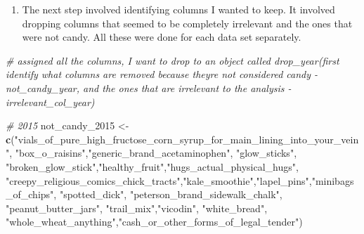 \documentclass[
]{article}
\newenvironment{Shaded}{\begin{snugshade}}{\end{snugshade}}
\newcommand{\CommentTok}[1]{\textcolor[rgb]{0.56,0.35,0.01}{\textit{#1}}}
\newcommand{\FunctionTok}[1]{\textcolor[rgb]{0.13,0.29,0.53}{\textbf{#1}}}
\newcommand{\NormalTok}[1]{#1}
\newcommand{\OtherTok}[1]{\textcolor[rgb]{0.56,0.35,0.01}{#1}}
\newcommand{\StringTok}[1]{\textcolor[rgb]{0.31,0.60,0.02}{#1}}
\providecommand{\tightlist}{%
  \setlength{\itemsep}{0pt}\setlength{\parskip}{0pt}}
\begin{document}
\begin{enumerate}
\def\labelenumi{\arabic{enumi}.}
\setcounter{enumi}{2}
\tightlist
\item
  The next step involved identifying columns I wanted to keep. It
  involved dropping columns that seemed to be completely irrelevant and
  the ones that were not candy. All these were done for each data set
  separately.
\end{enumerate}

\begin{Shaded}
\begin{Highlighting}[]
\CommentTok{\#  assigned all the columns, I want to drop to an object called \textquotesingle{}drop\_year\textquotesingle{}(first identify what columns are removed because they\textquotesingle{}re not considered candy {-} \textquotesingle{}not\_candy\_year\textquotesingle{}, and the ones that are irrelevant to the analysis {-} \textquotesingle{}irrelevant\_col\_year\textquotesingle{})}

\CommentTok{\# 2015}
\NormalTok{not\_candy\_2015 }\OtherTok{\textless{}{-}} \FunctionTok{c}\NormalTok{(}\StringTok{"vials\_of\_pure\_high\_fructose\_corn\_syrup\_for\_main\_lining\_into\_your\_vein"}\NormalTok{, }\StringTok{"box\_o\_raisins"}\NormalTok{,}\StringTok{"generic\_brand\_acetaminophen"}\NormalTok{, }\StringTok{"glow\_sticks"}\NormalTok{, }\StringTok{"broken\_glow\_stick"}\NormalTok{,}\StringTok{"healthy\_fruit"}\NormalTok{,}\StringTok{"hugs\_actual\_physical\_hugs"}\NormalTok{,  }\StringTok{"creepy\_religious\_comics\_chick\_tracts"}\NormalTok{,}\StringTok{"kale\_smoothie"}\NormalTok{,}\StringTok{"lapel\_pins"}\NormalTok{,}\StringTok{"minibags\_of\_chips"}\NormalTok{, }\StringTok{"spotted\_dick"}\NormalTok{, }\StringTok{"peterson\_brand\_sidewalk\_chalk"}\NormalTok{, }\StringTok{"peanut\_butter\_jars"}\NormalTok{, }\StringTok{"trail\_mix"}\NormalTok{,}\StringTok{"vicodin"}\NormalTok{, }\StringTok{"white\_bread"}\NormalTok{, }\StringTok{"whole\_wheat\_anything"}\NormalTok{,}\StringTok{"cash\_or\_other\_forms\_of\_legal\_tender"}\NormalTok{)}


\end{Highlighting}
\end{Shaded}
\end{document}
